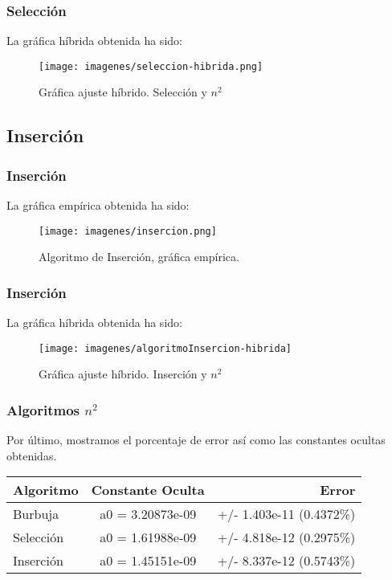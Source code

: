 \documentclass{beamer}
\begin{document}
\begin{frame}
	\frametitle{Selección}
	La gráfica híbrida obtenida ha sido:
	\begin{figure}
		\centering
		\texttt{[image: imagenes/seleccion-hibrida.png]}
		\caption{Gráfica ajuste híbrido. Selección y $n^2$}
		\label{fig:E5}
	\end{figure}
	
\end{frame}
\subsection{Inserción}
\begin{frame}
	\frametitle{Inserción}
	La gráfica empírica obtenida ha sido:
	\begin{figure}
		\centering
		\texttt{[image: imagenes/insercion.png]}
		\caption{Algoritmo de Inserción, gráfica empírica.}
		\label{fig:E6}
	\end{figure}
	
\end{frame}

\begin{frame}
	\frametitle{Inserción}
	La gráfica híbrida obtenida ha sido:
	\begin{figure}
		\centering
		\texttt{[image: imagenes/algoritmoInsercion-hibrida]}
		\caption{Gráfica ajuste híbrido. Inserción y $n^2$}
		\label{fig:E7}
	\end{figure}
	
\end{frame}


\begin{frame}
	\frametitle{Algoritmos $n^2$}
	Por último, mostramos el porcentaje de error así como las constantes ocultas obtenidas.\\
	
	\begin{center}
		\begin{tabular}{| l | c | r |}
			\hline
			\textbf{Algoritmo} & \textbf{Constante Oculta} & \textbf{Error} \\ \hline
			Burbuja & a0 = 3.20873e-09 & +/- 1.403e-11 (0.4372\%)\\ \hline
			Selección & a0 = 1.61988e-09 & +/- 4.818e-12 (0.2975\%) \\ \hline
			Inserción & a0 = 1.45151e-09 &  +/- 8.337e-12    (0.5743\%) \\ \hline
		\end{tabular}
	\end{center}

	
	
\end{frame}
\end{document}
